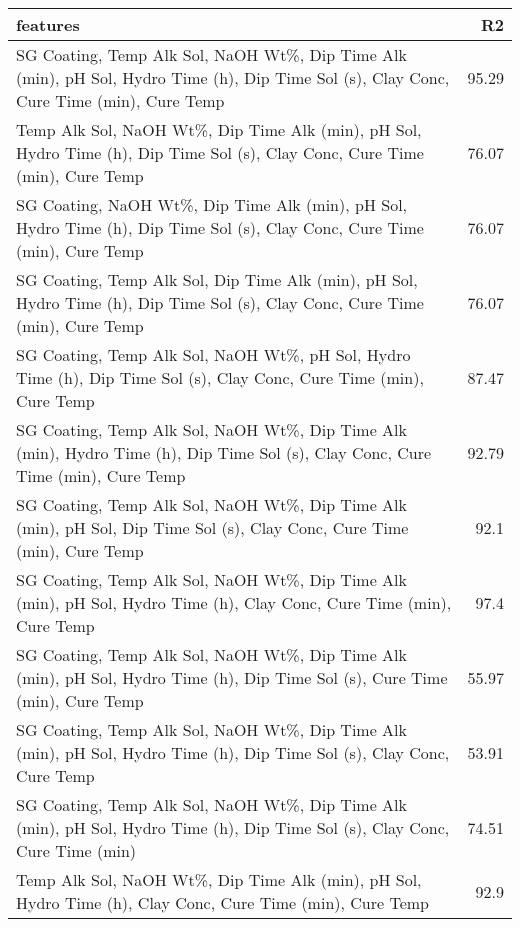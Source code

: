 
    \begin{table*}[h]
        \centering
        \begin{tabular}{lr}
\hline
 features                                                                                                                                 &    R2 \\
\hline
 SG Coating, Temp Alk Sol, NaOH Wt\%, Dip Time Alk (min), pH Sol, Hydro Time (h), Dip Time Sol (s), Clay Conc, Cure Time (min), Cure Temp & 95.29 \\
 Temp Alk Sol, NaOH Wt\%, Dip Time Alk (min), pH Sol, Hydro Time (h), Dip Time Sol (s), Clay Conc, Cure Time (min), Cure Temp             & 76.07 \\
 SG Coating, NaOH Wt\%, Dip Time Alk (min), pH Sol, Hydro Time (h), Dip Time Sol (s), Clay Conc, Cure Time (min), Cure Temp               & 76.07 \\
 SG Coating, Temp Alk Sol, Dip Time Alk (min), pH Sol, Hydro Time (h), Dip Time Sol (s), Clay Conc, Cure Time (min), Cure Temp            & 76.07 \\
 SG Coating, Temp Alk Sol, NaOH Wt\%, pH Sol, Hydro Time (h), Dip Time Sol (s), Clay Conc, Cure Time (min), Cure Temp                     & 87.47 \\
 SG Coating, Temp Alk Sol, NaOH Wt\%, Dip Time Alk (min), Hydro Time (h), Dip Time Sol (s), Clay Conc, Cure Time (min), Cure Temp         & 92.79 \\
 SG Coating, Temp Alk Sol, NaOH Wt\%, Dip Time Alk (min), pH Sol, Dip Time Sol (s), Clay Conc, Cure Time (min), Cure Temp                 & 92.1  \\
 SG Coating, Temp Alk Sol, NaOH Wt\%, Dip Time Alk (min), pH Sol, Hydro Time (h), Clay Conc, Cure Time (min), Cure Temp                   & 97.4  \\
 SG Coating, Temp Alk Sol, NaOH Wt\%, Dip Time Alk (min), pH Sol, Hydro Time (h), Dip Time Sol (s), Cure Time (min), Cure Temp            & 55.97 \\
 SG Coating, Temp Alk Sol, NaOH Wt\%, Dip Time Alk (min), pH Sol, Hydro Time (h), Dip Time Sol (s), Clay Conc, Cure Temp                  & 53.91 \\
 SG Coating, Temp Alk Sol, NaOH Wt\%, Dip Time Alk (min), pH Sol, Hydro Time (h), Dip Time Sol (s), Clay Conc, Cure Time (min)            & 74.51 \\
 Temp Alk Sol, NaOH Wt\%, Dip Time Alk (min), pH Sol, Hydro Time (h), Clay Conc, Cure Time (min), Cure Temp                               & 92.9  \\

\end{tabular}
\end{table*}
